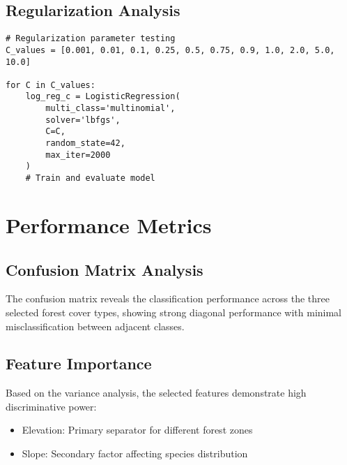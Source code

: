 \documentclass[12pt,a4paper]{article}
\begin{document}
\subsection{Regularization Analysis}
\begin{lstlisting}
# Regularization parameter testing
C_values = [0.001, 0.01, 0.1, 0.25, 0.5, 0.75, 0.9, 1.0, 2.0, 5.0, 10.0]

for C in C_values:
    log_reg_c = LogisticRegression(
        multi_class='multinomial',
        solver='lbfgs',
        C=C,
        random_state=42,
        max_iter=2000
    )
    # Train and evaluate model
\end{lstlisting}

\section{Performance Metrics}
\label{app:metrics}

\subsection{Confusion Matrix Analysis}
The confusion matrix reveals the classification performance across the three selected forest cover types, showing strong diagonal performance with minimal misclassification between adjacent classes.

\subsection{Feature Importance}
Based on the variance analysis, the selected features demonstrate high discriminative power:
\begin{itemize}
    \item Elevation: Primary separator for different forest zones
    \item Slope: Secondary factor affecting species distribution
\end{itemize}
\end{document}
